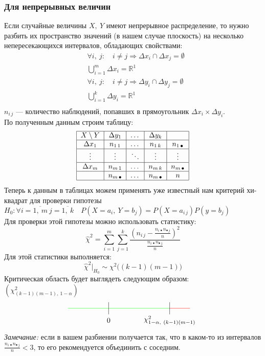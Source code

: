 \documentclass[12pt, a4paper]{article}
\newcommand{\real}{\mathbb{R}}
\begin{document}
\subsubsection*{Для непрерывных величин}
Если случайные величины $X,\ Y$ имеют непрерывное распределение, то нужно разбить их пространство значений (в нашем случае плоскость) на несколько непересекающихся интервалов, обладающих свойствами:
\begin{equation*}
    \begin{aligned}
        & \forall i,\ j:\quad i \neq j \Rightarrow \Delta x_i \cap \Delta x_j = \emptyset\\
        & \bigcup\limits_{i = 1}^{m} \Delta x_i = \real^1\\
        & \forall i,\ j:\quad i \neq j \Rightarrow \Delta y_i \cap \Delta y_j = \emptyset\\
        & \bigcup\limits_{i = 1}^{k} \Delta y_i = \real^1\\
    \end{aligned}
\end{equation*}
$n_{i\, j}$ --- количество наблюдений, попавших в прямоугольник $\Delta x_i \times \Delta y_i$.\\
По полученным данным строим таблицу:
\[
    \begin{tabular}{|c|c|c|c|c|}
        \hline
        $X\setminus Y$ & $\Delta y_1$ & $\dots$ & $\Delta y_k$ & \\
        \hline
        $\Delta x_1$          & $n_{1\, 1}$ & $\dots$ & $n_{1\, k}$ & $n_{1\, \bullet}$\\
        \hline
        $\vdots$       & $\vdots$ & $\ddots$ & $\vdots$ & $\vdots$\\
        \hline
        $\Delta x_m$          & $n_{m\, 1}$ & $\dots$ & $n_{m\, k}$ & $n_{m\, \bullet}$\\
        \hline
                     & $n_{m\, \bullet}$ & $\dots$ & $n_{m\, \bullet}$ & $n$\\
        \hline
    \end{tabular}
\]
Теперь к данным в таблицах можем применять уже известный нам критерий хи-квадрат для проверки гипотезы $H_0: \forall i = \overline{1,\ m}\ j = \overline{1,\ k}\quad P(X = a_{i},\ Y = b_{j}) = P(X = a_{i\, j}) P(y = b_j)$\\
Для проверки этой гипотезы можно использовать статистику:
\[
\hat \chi^2 = \sum_{i = 1}^{m} \sum_{j = 1}^{k} \frac{ { \left( n_{i\, j} - \frac{n_{i\, \bullet} n_{\bullet\, j}}{n} \right) }^2 }{\frac{n_{i\, \bullet} n_{\bullet\, j}}{n}}
\]
Для этой статистики выполняется:
\[
\hat \chi^2 \Big|_{H_0} \sim \chi^2\big( (k - 1)(m - 1) \big)
\]
Критическая область будет выглядеть следующим образом: $(\chi^2_{(k - 1)(m - 1),\ 1 - \alpha})$
\[\begin{tikzpicture}[scale=2]
    \draw[green] (-1, 0) -- (0, 0);
    \draw[green] (0, 0) -- (1.5, 0);
    \draw[red] (1.5, 0) -- (2, 0);
    \draw (0, -0.15) -- ++(0, 0.3);
    \node at (0, -0.3) (a) {$0$};
    \draw (1.5, -0.15) -- ++(0, 0.3);
    \node at (1.5, -0.3) (a) {$\chi^2_{1 - \alpha,\ (k - 1)(m - 1)}$};
\end{tikzpicture}\]
\textit{Замечание:} если в вашем разбиении получается так, что в каком-то из интервалов $\frac{n_{i\, \bullet} n_{\bullet\, j}}{n} < 3$, то его рекомендуется объединить с соседним.
\end{document}
